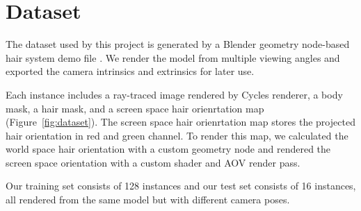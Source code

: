 \documentclass[12pt]{article}
\begin{document}
\section{Dataset}


The dataset used by this project is generated by a Blender geometry node-based hair system demo file \cite{foundation_blender_nodate}. We render the model from multiple viewing angles and exported the camera intrinsics and extrinsics for later use.

Each instance includes a ray-traced image rendered by Cycles renderer, a body mask, a hair mask, and a screen space hair orienrtation map (Figure~\ref{fig:dataset}). The screen space hair orienrtation map stores the projected hair orientation in red and green channel. To render this map, we calculated the world space hair orientation with a custom geometry node and rendered the screen space orientation with a custom shader and AOV render pass.

Our training set consists of 128 instances and our test set consists of 16 instances, all rendered from the same model but with different camera poses.
\end{document}
